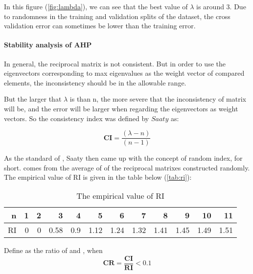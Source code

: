 In this figure (\autoref{fig:lambda}), we can see that the best value of $\lambda$ is around 3. Due to randomness in the training and validation splits of the dataset, the cross validation error can sometimes be lower than the training error.



\paragraph{Stability analysis of AHP}

In general, the reciprocal matrix is not consistent. But in order to use the eigenvectors corresponding to max eigenvalues as the weight vector of compared elements, the inconsistency should be in the allowable range.

But the larger that $\lambda$ is than n, the more severe that the inconsistency of matrix  will be, and the error will be larger when regarding the eigenvectors as weight vectors. So the consistency index was defined by $Saaty$ as:

\begin{equation}
\boldsymbol{CI} = \frac{(\lambda - n)} { (n - 1)}
\end{equation}

As the standard of , Saaty then came up with the concept of random index,  for short.  comes from the average of  of the reciprocal matrixes constructed randomly. The empirical value of RI is given in the table below (\autoref{tab:ri}):

\begin{table}[htbp]
  \centering
  \caption{The empirical value of RI}
    \begin{tabular}{rrrrrrrrrrrr}
    \toprule
    n     & 1     & 2     & 3     & 4     & 5     & 6     & 7     & 8     & 9     & 10    & 11 \\
    \midrule
    RI    & 0     & 0     & 0.58  & 0.9   & 1.12  & 1.24  & 1.32  & 1.41  & 1.45  & 1.49  & 1.51 \\
    \bottomrule
    \end{tabular}%
  \label{tab:ri}%
\end{table}%

Define  as the ratio of  and , when
\begin{equation}
\boldsymbol{CR} = \frac{\boldsymbol{CI} }{\boldsymbol{RI}} < 0.1
\end{equation}

